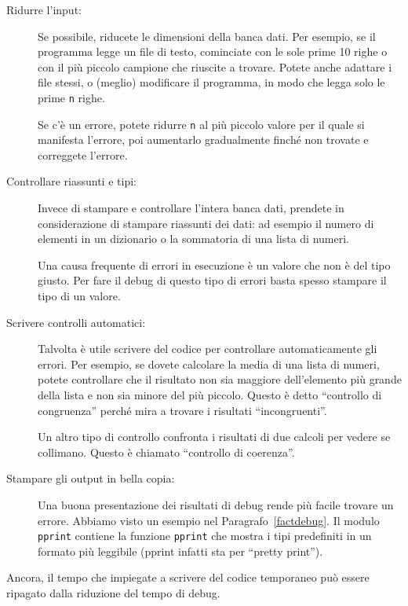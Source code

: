 \documentclass[10pt]{book}
\begin{document}
\begin{description}

\item[Ridurre l'input:] Se possibile, riducete le dimensioni della banca dati. Per esempio, se il programma legge un file di testo, cominciate con le sole prime 10 righe o con il più piccolo campione che riuscite a trovare. Potete anche adattare i file stessi, o (meglio) modificare il programma, in modo che legga solo le prime {\tt n} righe.

Se c'è un errore, potete ridurre {\tt n} al più piccolo valore per il quale si manifesta l'errore, poi aumentarlo gradualmente finché non trovate e correggete l'errore.

\item[Controllare riassunti e tipi:] Invece di stampare e controllare l'intera banca dati, prendete in considerazione di stampare riassunti dei dati: ad esempio il numero di elementi in un dizionario o la sommatoria di una lista di numeri.

Una causa frequente di errori in esecuzione è un valore che non è del tipo giusto. Per fare il debug di questo tipo di errori basta spesso stampare il tipo di un valore.

\item[Scrivere controlli automatici:]  Talvolta è utile scrivere del codice per controllare automaticamente gli errori. Per esempio, se dovete calcolare la media di una lista di numeri, potete controllare che il risultato non sia maggiore dell'elemento più grande della lista e non sia minore del più piccolo. Questo è detto ``controllo di congruenza'' perché mira a trovare i risultati ``incongruenti''.

Un altro tipo di controllo confronta i risultati di due calcoli per vedere se collimano. Questo è chiamato ``controllo di coerenza''.

\item[Stampare gli output in bella copia:] Una buona presentazione dei risultati di debug rende più facile trovare un errore. Abbiamo visto un esempio nel Paragrafo~\ref{factdebug}.  Il modulo {\tt pprint} contiene la funzione {\tt pprint} che mostra i tipi predefiniti in un formato più leggibile (pprint infatti sta per ``pretty print'').

\end{description}

Ancora, il tempo che impiegate a scrivere del codice temporaneo può essere ripagato dalla riduzione del tempo di debug.
\end{document}

